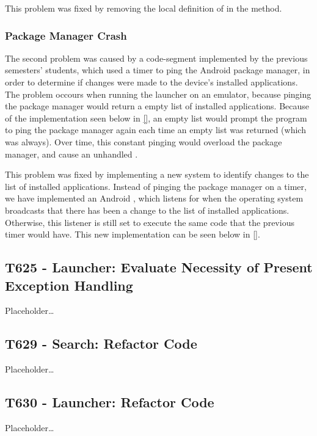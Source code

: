 
This problem was fixed by removing the local definition of 
in the  method.

\subsubsection{Package Manager Crash}
The second problem was caused by a code-segment implemented by the previous
semesters' students, which used a timer to ping the Android package manager, in
order to determine if changes were made to the device's installed applications.
The problem occours when running the launcher on an emulator, because pinging
the package manager would return a empty list of installed applications. Because
of the implementation seen below in \autoref{}, an empty list would prompt
the program to ping the package manager again each time an empty list was
returned (which was always). Over time, this constant pinging would overload
the package manager, and cause an unhandled .\nl

\nl

This problem was fixed by implementing a new system to identify changes to the
list of installed applications. Instead of pinging the package manager on a
timer, we have implemented an Android , which listens
for when the operating system broadcasts that there has been a change to the
list of installed applications. Otherwise, this listener is still set to
execute the same code that the previous timer would have. This new
implementation can be seen below in \autoref{}.\nl


\subsection{T625 - Launcher: Evaluate Necessity of Present Exception Handling}
Placeholder\ldots

\subsection{T629 - Search: Refactor Code}
Placeholder\ldots

\subsection{T630 - Launcher: Refactor Code}
Placeholder\ldots

